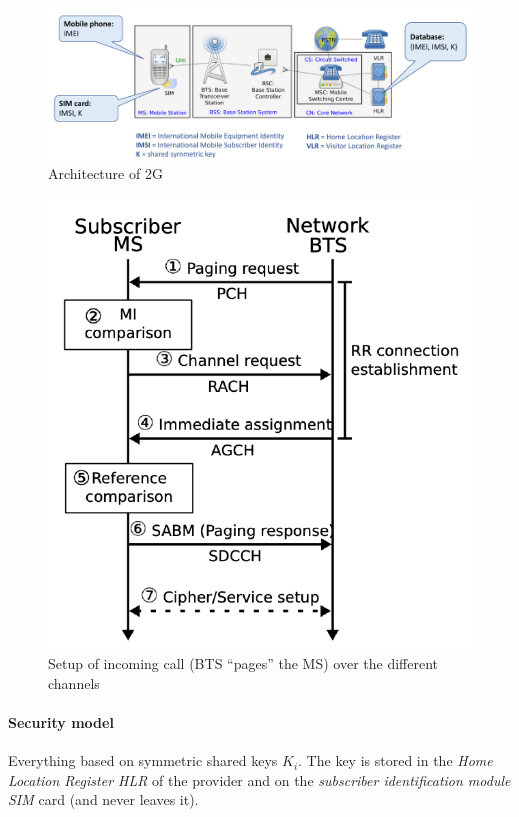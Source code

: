 \begin{figure}[h]
	\centering
	\includegraphics[scale=0.45]{images/10-2g-arch.png}
	\caption{Architecture of 2G}
	\label{fig:2g-arch}
\end{figure}

\begin{figure}
	\centering
	\includegraphics[scale=0.4]{images/10-2g-channels.png}
	\caption{Setup of incoming call (BTS ``pages'' the MS) over the different channels}
	\label{fig:2g-channels}
\end{figure}

\paragraph{Security model}
Everything based on symmetric shared keys $K_i$.
The key is stored in the \textit{Home Location Register HLR} of the provider and on the \textit{subscriber identification module SIM} card (and never leaves it).

